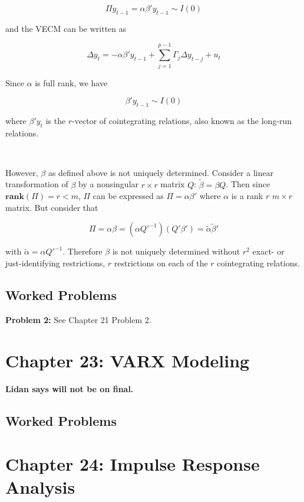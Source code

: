 \[
\Pi y_{t-1} = \alpha \beta' y_{t-1} \sim I(0)
\]

and the VECM can be written as

\begin{equation}\label{ts.eq.22.19}
\Delta y_{t} = -\alpha \beta' y_{t-1} + \sum_{j=1}^{p-1} \Gamma_j \Delta y_{t-j} + u_t
\end{equation}

Since \(\alpha\) is full rank, we have

\[
\beta' y_{t-1} \sim I(0)
\]

where \(\beta'y_t\) is the \(r\)-vector of cointegrating relations, also known as the long-run relations.

\

However, \(\beta\) as defined above is not uniquely determined. Consider a linear transformation of \(\beta\) by a nonsingular \(r \times r\) matrix \(Q\): \(\tilde{\beta} = \beta Q\). Then since \(\textbf{rank}(\Pi) = r < m\), \(\Pi\) can be expressed as \(\Pi = \alpha \beta'\) where \(\alpha\) is a rank \(r\) \(m \times r\) matrix. But consider that 

\[
\Pi = \alpha \beta = (\alpha {Q'}^{-1})(Q' \beta') = \tilde{\alpha} \tilde{\beta}'
\]

with \(\tilde{\alpha} = \alpha {Q'}^{-1}\). Therefore \(\beta\) is not uniquely determined without \(r^2\) exact- or just-identifying restrictions, \(r\) restrictions on each of the \(r\) cointegrating relations. 

\subsection{Worked Problems}

\textbf{Problem 2:} See Chapter 21 Problem 2.

%
%
%
%
%
%

\section{Chapter 23: VARX Modeling}

\textbf{Lidan says will not be on final.}

\subsection{Worked Problems}

%
%
%
%
%
%

\section{Chapter 24: Impulse Response Analysis}


